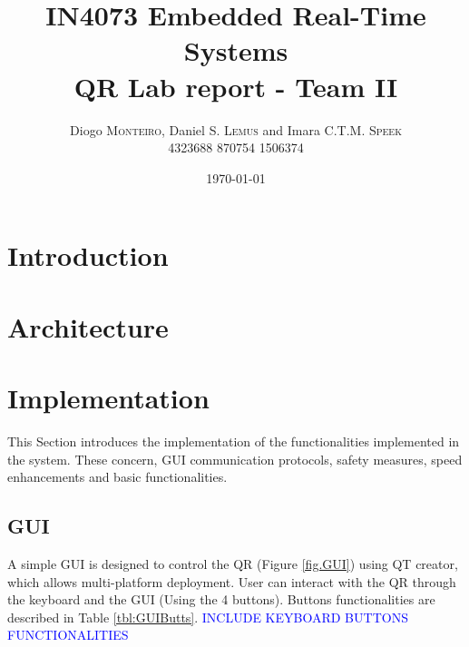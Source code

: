 \documentclass{article}
\title{IN4073 Embedded Real-Time Systems \\ QR Lab report - Team II} %
\author{Diogo \textsc{Monteiro}, Daniel S. \textsc{Lemus} and Imara C.T.M. \textsc{Speek} \\
		4323688 870754 1506374} %
\date{\today} %
\newcommand\todo[1]{\textcolor{blue}{#1}} %
\begin{document}
\maketitle %

 \begin{abstract}


 \end{abstract}


\section{Introduction}
\label{sec:introduction}



\section{Architecture}
\label{sec:architecture}





\section{Implementation}
\label{sec:implementation}

This Section introduces the implementation of the functionalities implemented in the system. These concern, GUI communication protocols, safety measures, speed enhancements and basic functionalities.


\subsection{GUI}
A simple GUI is designed to control the QR (Figure \ref{fig.GUI}) using QT creator, which allows multi-platform deployment. User can interact with the QR through the keyboard and the GUI (Using the 4 buttons). Buttons functionalities are described in Table \ref{tbl:GUIButts}. \todo{INCLUDE KEYBOARD BUTTONS FUNCTIONALITIES}
\end{document}

